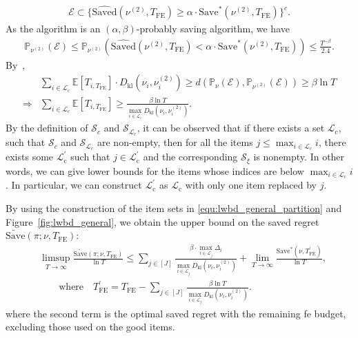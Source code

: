 \documentclass[twoside,11pt]{article}
\newcommand{\kl}{D_{\mathrm{kl}}}
\newcommand{\calE}{\mathcal{E}}
\newcommand{\calL}{\mathcal{L}}
\newcommand{\calS}{\mathcal{S}}
\newcommand{\rmc}{\mathrm{c}}
\newcommand{\rmg}{\mathrm{g}}
\newcommand{\bbE}{\mathbb{E}}
\newcommand{\bbP}{\mathbb{P}}
\newcommand{\Tfe}{T_{\mathrm{FE}}}
\newcommand{\Saved}{\mathrm{Save}}
\newcommand{\whatSaved}{\widehat{\mathrm{Saved}}}
\begin{document}
\begin{align}
    \calE \subset \{\whatSaved(\nu^{(2)},\Tfe)\geq \alpha\cdot \Saved^*(\nu^{(2)},\Tfe) \}^c.
\end{align}
As the algorithm is an $(\alpha, \beta)$-probably saving algorithm, we have 
\begin{align}
    \bbP_{\nu^{(2)}}(\calE)\leq \bbP_{\nu^{(2)}}(\whatSaved(\nu^{(2)},\Tfe)< \alpha\cdot \Saved^*(\nu^{(2)},\Tfe)) \leq \frac{T^{-\beta}}{2.4}.
\end{align}
By~\citet[Lemma~1]{kaufmann2016complexity},
\begin{align}
    &\sum_{i\in\calL_{\rmc}}\bbE[T_{i,\Tfe}] \cdot \kl(\nu_i,\nu_i^{(2)})
    \geq
    d(\bbP_{\nu}(\calE),\bbP_{\nu^{(2)}}(\calE))
    \geq
    \beta\ln T
    \\
    \Rightarrow&
    \sum_{i\in\calL_{\rmc}}\bbE[T_{i,\Tfe}]\geq \frac{\beta\ln T}{\max_{i\in\calL_{\rmc}} \kl(\nu_i,\nu_i^{(2)})}.
\end{align}
By the definition of  $\calS_{c}$ and $\calS_{\calL_{\rmc}}$, it can be observed that if there exists a set $\calL_{\rmc}$, such that $\calS_{c}$ and $\calS_{\calL_{\rmc}}$ are non-empty, then for all the items $j\leq \max_{i\in\calL_{\rmc}} i$, there exists some $\calL_{\rmc}^\prime$ such that $j\in \calL_{\rmc}^\prime$ and the corresponding $\calS_\xi$ is nonempty. In other words, we can give lower bounds for the items whose indices are below $\max_{i\in\calL_{\rmc}} i$.
In particular, we can construct $\calL_{\rmc}^\prime$ as $\calL_{\rmc}$ with only one item replaced by $j$.

By using the construction of the item sets in \eqref{equ:lwbd_general_partition} and Figure~\ref{fig:lwbd_general},
we obtain the upper bound on the saved regret $\widetilde{\Saved}(\pi;\nu,\Tfe)$:
\begin{align}
    &\limsup_{T\to\infty} \frac{\widetilde{\Saved}(\pi;\nu,\Tfe)}{\ln T}
    \leq 
        \sum_{j\in[J]}\frac{\beta\cdot \max_{i\in\calL_j} \Delta_i}{\max_{i\in\calL_j} \kl(\nu_i,\nu_i^{(2)})}
        +
        \lim_{T\to\infty}\frac{\Saved^*(\nu,\Tfe^\prime)}{\ln T},
        \\
    &\qquad \mbox{where}\quad
    \Tfe^\prime = \Tfe -  \sum_{j\in[J]}\frac{\beta\ln T}{\max_{i\in\calL_j} \kl(\nu_i,\nu_i^{(2)})}.
\end{align}
where the second term is the optimal saved regret with the remaining \ac{fe} budget, excluding those used on the good items.
\end{document}
